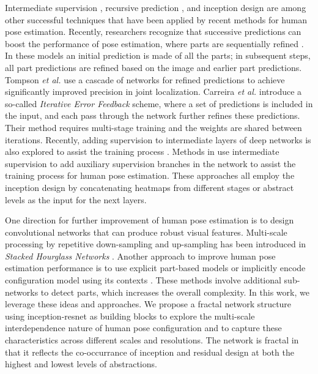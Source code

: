 \documentclass[journal ]{IEEEtran}
\begin{document}
Intermediate supervision \cite{wang2015training}, recursive prediction \cite{belagiannis2016recurrent}, and inception design \cite{szegedy2015going, szegedy2016rethinking} are among other successful techniques that have been applied by recent methods for human pose estimation. 
Recently, researchers recognize that successive predictions can boost the performance of pose estimation, where parts are sequentially refined \cite{toshev2014deeppose, ramakrishna2014pose, wei2016convolutional, carreira2016human}. In these models an initial prediction is made of all the parts; in subsequent steps, all part predictions are refined based on the image and earlier part predictions.
Tompson {\it et al.} \cite{tompson2015efficient} use a cascade of networks for refined predictions to achieve significantly improved precision in joint localization.
Carreira {\it et al.} \cite{carreira2016human} introduce a so-called \textit{Iterative Error Feedback} scheme, where a set of predictions is included in the input, and each pass through the network further refines these predictions. Their method requires multi-stage training and the weights are shared between iterations.
Recently, adding supervision to intermediate layers of deep networks is also explored to assist the training process \cite{szegedy2015going, lee2015deeply}.
Methods in \cite{newell2016stacked, wei2016convolutional, insafutdinov2016deepercut, belagiannis2016recurrent} use intermediate supervision to add auxiliary supervision branches 
in the network to assist the training process for human pose estimation. These approaches all employ the inception design by concatenating heatmaps from different stages or abstract levels as the input for the next layers.

One direction for further improvement of human pose estimation is to design convolutional networks that can produce robust visual features. Multi-scale processing by repetitive down-sampling and up-sampling has been introduced in \textit{Stacked Hourglass Networks} \cite{newell2016stacked}.
Another approach to improve human pose estimation performance is to use explicit part-based models \cite{karlinsky2012using, dantone2013human, yang2013articulated} or implicitly encode configuration model using its contexts \cite{bulat2016human}. These methods involve additional sub-networks to detect parts, which increases the overall complexity. 
In this work, we leverage these ideas and approaches. We propose a fractal network structure using inception-resnet as building blocks to explore the multi-scale interdependence nature of human pose configuration and to capture these characteristics across different scales and resolutions. The network is fractal in that it reflects the co-occurrance of inception and residual design at both the highest and lowest levels of abstractions. 
\end{document}
